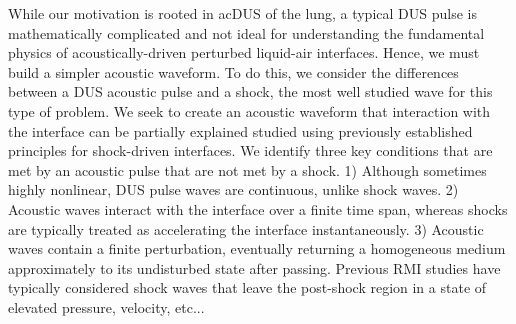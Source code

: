 While our motivation is rooted in ac{DUS} of the lung, a typical
\ac{DUS} pulse is mathematically complicated and not ideal for
understanding the fundamental physics of acoustically-driven perturbed
liquid-air interfaces. Hence, we must build a simpler acoustic
waveform. To do this, we consider the differences between a \ac{DUS}
acoustic pulse and a shock, the most well studied wave for this type
of problem. We seek to create an acoustic waveform that interaction
with the interface can be partially explained studied using previously
established principles for shock-driven interfaces. We identify three
key conditions that are met by an acoustic pulse that are not met by a
shock. 1) Although sometimes highly nonlinear, \ac{DUS} pulse waves
are continuous, unlike shock waves. 2) Acoustic waves interact with
the interface over a finite time span, whereas shocks are typically
treated as accelerating the interface instantaneously. 3) Acoustic
waves contain a finite perturbation, eventually returning a
homogeneous medium approximately to its undisturbed state after
passing. Previous \ac{RMI} studies have typically considered shock
waves that leave the post-shock region in a state of elevated
pressure, velocity, etc... 

